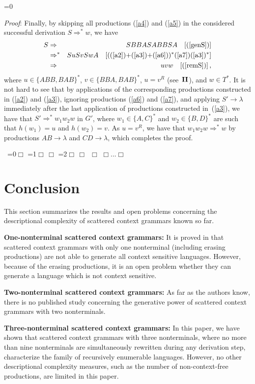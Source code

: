 \documentclass[copyright]{eptcs}
\makeatletter
\newcounter{d@proof}\let\thed@proof\relax\setcounter{d@proof}{0}
\newcommand*{\qed}{$\Box$}
\newenvironment{proof}{\ifnum \value{d@proof}=0{\setcounter{claim}{0}}\else\fi
  \stepcounter{d@proof}\par\noindent
  {\rmfamily\itshape\mdseries Proof\/}:\hspace{\labelsep}\ignorespaces}{\addtocounter{d@proof}{-1}\mbox{}\nolinebreak\hfill~\ifnum \value{d@proof}=0{\qed}\else
    \ifnum \value{d@proof}=1{\qed\nolinebreak\,\nolinebreak\qed}\else
      \ifnum \value{d@proof}=2{\qed\nolinebreak\,\nolinebreak\qed
          \nolinebreak\,\nolinebreak\qed}\else
        {\qed\nolinebreak...\nolinebreak\qed}\fi\fi\fi
  \medbreak
}
\newcommand{\Ra}{\Rightarrow}
\newcommand{\eps}{\lambda}
\makeatother
\begin{document}
\begin{proof}
    Finally, by skipping all productions (\ref{a4}) and (\ref{a5}) in the considered successful derivation $S\Ra^* w$, we have
    \begin{eqnarray*}
      S & \Ra   & SBBASABBSA \quad [\textrm{(\ref{genS})}]\\
        & \Ra^* & SuSvSwA \quad [\textrm{((\ref{a2})+(\ref{a3})+(\ref{a6}))$^*$(\ref{a7})(\ref{a3})$^*$}]\\
        & \Ra   & uvw \quad [\textrm{(\ref{remS})}]\,,
    \end{eqnarray*}
    where $u\in\{ABB,BAB\}^*$, $v\in\{BBA,BAB\}^*$, $u=v^R$ (see~${\bf II}$), and $w\in T^*$. It is not hard to see that by applications of the corresponding productions constructed in (\ref{a2}) and (\ref{a3}), ignoring productions (\ref{a6}) and (\ref{a7}), and applying $S'\to\eps$ immediately after the last application of productions constructed in~(\ref{a3}), we have that $S'\Ra^* w_1w_2w$ in $G'$, where $w_1\in\{A,C\}^*$ and $w_2\in\{B,D\}^*$ are such that $h(w_1)=u$ and $h(w_2)=v$. As $u=v^R$, we have that $w_1w_2w\Ra^* w$ by productions $AB\to\eps$ and $CD\to\eps$, which completes the proof.
  \end{proof}

\section{Conclusion}
  This section summarizes the results and open problems concerning the descriptional complexity of scattered context grammars known so far.

  {\bf One-nonterminal scattered context grammars:}
  It is proved in \cite{meduna2} that scattered context grammars with only one nonterminal (including erasing productions) are not able to generate all context sensitive languages. However, because of the erasing productions, it is an open problem whether they can generate a language which is not context sensitive.

  {\bf Two-nonterminal scattered context grammars:}
  As far as the authors know, there is no published study concerning the generative power of scattered context grammars with two nonterminals.

  {\bf Three-nonterminal scattered context grammars:}
  In this paper, we have shown that scattered context grammars with three nonterminals, where no more than nine nonterminals are simultaneously rewritten during any derivation step, characterize the family of recursively enumerable languages. However, no other descriptional complexity measures, such as the number of non-context-free productions, are limited in this paper.
\end{document}

